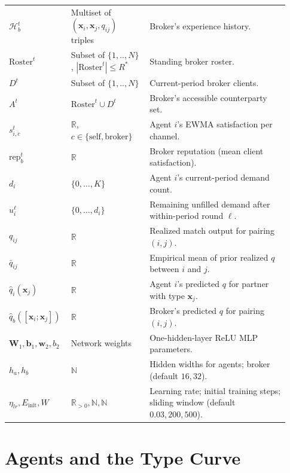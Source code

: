 \documentclass[11pt]{article}
\newcommand{\x}{\mathbf{x}}
\newcommand{\Roster}{\mathrm{Roster}}
\newcommand{\Hist}{\mathcal{H}}
\newcommand{\qhat}{\hat{q}}
\newcommand{\rep}{\mathrm{rep}}
\newcommand{\R}{\mathbb{R}}
\newcommand{\self}{\mathrm{self}}
\newcommand{\brk}{\mathrm{broker}}
\newcommand{\Ntot}{N}
\begin{document}
{\begin{longtable}{@{}p{0.18\linewidth}p{0.27\linewidth}p{0.48\linewidth}@{}}
$\Hist_b^t$ & Multiset of $(\x_i,\x_j,q_{ij})$ triples & Broker's experience history.\\
$\Roster^t$ & Subset of $\{1,..,\Ntot\}$, $|\Roster^t|\le R^*$ & Standing broker roster.\\
$D^t$ & Subset of $\{1,..,\Ntot\}$ & Current-period broker clients.\\
$A^t$ & $\Roster^t\cup D^t$ & Broker's accessible counterparty set.\\
$s_{i,c}^t$ & $\R$, $c\in\{\self,\brk\}$ & Agent $i$'s EWMA satisfaction per channel.\\
$\rep_b^t$ & $\R$ & Broker reputation (mean client satisfaction).\\
$d_i$ & $\{0,\ldots,K\}$ & Agent $i$'s current-period demand count.\\
$u_i^{\ell}$ & $\{0,\ldots,d_i\}$ & Remaining unfilled demand after within-period round $\ell$.\\
$q_{ij}$ & $\R$ & Realized match output for pairing $(i,j)$.\\
$\bar q_{ij}$ & $\R$ & Empirical mean of prior realized $q$ between $i$ and $j$.\\
$\qhat_i(\x_j)$ & $\R$ & Agent $i$'s predicted $q$ for partner with type $\x_j$.\\
$\qhat_b([\x_i;\x_j])$ & $\R$ & Broker's predicted $q$ for pairing $(i,j)$.\\
$\mathbf{W}_1,\mathbf{b}_1,\mathbf{w}_2,b_2$ & Network weights & One-hidden-layer ReLU MLP parameters.\\
$h_a, h_b$ & $\mathbb{N}$ & Hidden widths for agents; broker (default $16,32$).\\
$\eta_{lr}, E_{\text{init}}, W$ & $\R_{>0}, \mathbb{N}, \mathbb{N}$ & Learning rate; initial training steps; sliding window (default $0.03,200,500$).\\
\end{longtable}}

\section{Agents and the Type Curve}\label{sec:types}
\end{document}
